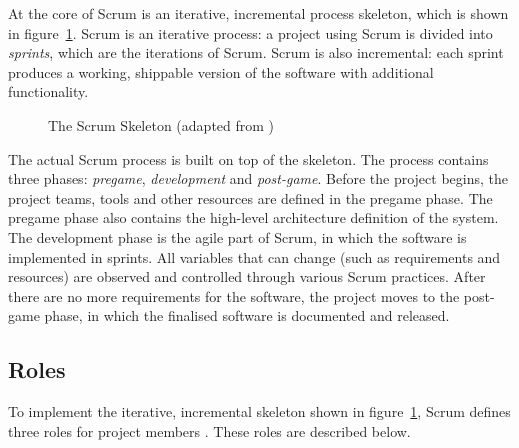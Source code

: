 At the core of Scrum is an iterative, incremental process skeleton, 
which is shown in figure~\ref{fig:scrumskeleton}. Scrum is an 
iterative process: a project using Scrum is divided into 
\textsl{sprints}, which are the iterations of Scrum. Scrum is also 
incremental: each sprint produces a working, shippable version of the 
software with additional functionality.

\begin{figure}
\begin{center}
  \caption{The Scrum Skeleton (adapted from \citep{agilescrum})}
  \label{fig:scrumskeleton}
\end{center}
\end{figure}

The actual Scrum process is built on top of the skeleton. The process 
contains three phases: \textsl{pregame}, \textsl{development} and 
\textsl{post-game}. Before the project begins, the project teams, 
tools and other resources are defined in the pregame phase. The 
pregame phase also contains the high-level architecture definition of 
the system. The development phase is the agile part of Scrum, in which 
the software is implemented in sprints. All variables that can change 
(such as requirements and resources) are observed and controlled 
through various Scrum practices. After there are no more requirements 
for the software, the project moves to the post-game phase, in which 
the finalised software is documented and released. \citep{agilesdm}


\subsection{Roles}
\label{toc:agile:scrum:roles}

To implement the iterative, incremental skeleton shown in 
figure~\ref{fig:scrumskeleton}, Scrum defines three roles for project 
members \citep{apmscrum,agilescrum}. These roles are described below.

